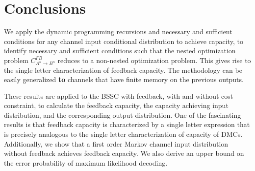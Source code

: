 \documentclass[11pt, a4paper, journal,onecolumn]{IEEEtran}
\newcommand{\rar}{\rightarrow}
\begin{document}
\section{Conclusions}
\label{sec_con}
\par We apply the dynamic programming recursions and necessary and sufficient conditions for any channel input conditional distribution to achieve capacity, to identify necessary and sufficient conditions such that the nested optimization problem $C_{A^n \rar B^n}^{FB}$ reduces to a non-nested optimization problem. This gives rise to the single letter characterization of feedback capacity. The  methodology  can be easily generalized {\bf to} channels that have finite memory on the previous outputs.
\par These results are applied to the BSSC with feedback, with and without cost constraint, to calculate the feedback capacity, the capacity achieving input distribution, and the corresponding output distribution. One of the fascinating results is that feedback capacity is characterized by a single letter expression that is precisely analogous to the single letter characterization of capacity of DMCs.  Additionally, we show that a first order Markov channel input distribution without feedback  achieves  feedback capacity. We also derive an upper bound on the error probability of maximum likelihood decoding. 
\end{document}
